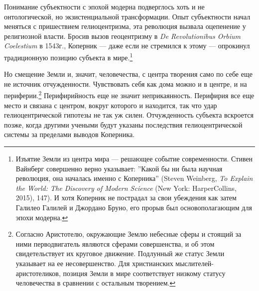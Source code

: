 \documentclass[12pt]{book}
\begin{document}
Понимание субъектности с эпохой модерна подверглось хоть и не онтологической, но экзистенциальной трансформации. Опыт субъектности начал меняться с пришествием гелиоцентризма, эта революция вызвала оцепенение у религиозной власти. Бросив вызов геоцентризму в \textit{De Revolutionibus Orbium Coelestium} в 1543г., Коперник --- даже если не стремился к этому --- опрокинул традиционную позицию субъекта в мире.\footnote{Изъятие Земли из центра мира --- решающее событие современности. Стивен Вайнберг совершенно верно указывает: ''Какой бы ни была научная революция, она началась именно с Коперника'' (Steven Weinberg, \textit{To Explain the World: The Discovery of Modern Science} (New York: HarperCollins, 2015), 147). И хотя Коперник не пострадал за свои убеждения как затем Галилео Галилей и Джордано Бруно, его прорыв был основополагающим для эпохи модерна.}

Но смещение Земли и, значит, человечества, с центра творения само по себе еще не источник отчужденности. Чувствовать себя как дома можно и в центре, и на периферии.\footnote{Согласно Аристотелю, окружающие Землю небесные сферы и стоящий за ними перводвигатель являются сферами совершенства, и об этом свидетельствует их круговое движение. Подлунный же статус Земли указывает на ее несовершенство. Для христианских мыслителей-аристотеликов, позиция Земли в мире соответствует низкому статусу человечества в сравнении с остальным творением.} Перифирийность еще не значит неприкаянность. Перифирия все еще место и связана с центром, вокруг которого и находится, так что удар гелиоцентрической гипотезы не так уж силен. Отчужденность субъекта вскроется позже, когда другими учеными будут указаны последствия гелиоцентрической системы за пределами выводов Коперника.
\end{document}
